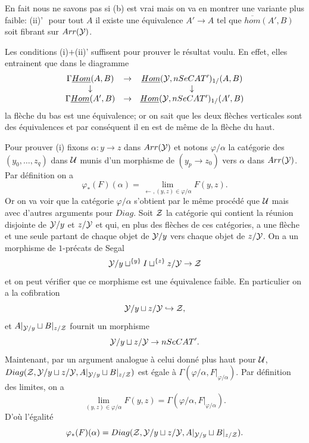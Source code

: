 \documentclass[12pt]{article}
\newcommand{\Uu}{{\cal U}}
\newcommand{\Yy}{{\cal Y}}
\newcommand{\Zz}{{\cal Z}}
\begin{document}
En fait nous ne savons pas si (b) est vrai mais on va en montrer une
variante plus
faible:
\newline
(ii)'\,\, pour tout $A$ il existe une \'equivalence $A'\rightarrow A$ tel que
$\overline{hom}(A',B)$ soit fibrant sur $Arr(\Yy )$.

Les conditions (i)$+$(ii)' suffisent pour prouver le r\'esultat
voulu. En effet, elles entrainent
que dans
le diagramme $$
\begin{array}{ccc}
\Gamma \underline{Hom}(A,B)&\rightarrow &\underline{Hom}(\Yy ,
nSeCAT')_{1/}(A,B)\\
\downarrow & & \downarrow \\
\Gamma \underline{Hom}(A',B)&\rightarrow &\underline{Hom}(\Yy ,
nSeCAT')_{1/}(A',B)
\end{array}
$$
la fl\`eche du bas est une \'equivalence; or on sait que les deux fl\`eches
verticales sont des \'equivalences et par cons\'equent
il en est de m\^eme de la fl\`eche du
haut.


Pour prouver (i) fixons $\alpha : y\rightarrow z$ dans $Arr(\Yy )$
et notons
$\varphi /\alpha $ la cat\'egorie des $(y_0,\ldots , z_q)$ dans $\Uu $
munis d'un
morphisme
de $(y_p\rightarrow z_0)$ vers $\alpha$ dans $Arr(\Yy )$.
Par d\'efinition on a
$$
\varphi _{\ast}(F)(\alpha ) = \lim _{\leftarrow , (y,z)\in \varphi /\alpha }
F(y,z).
$$
Or on va voir que la cat\'egorie $\varphi /\alpha $ s'obtient par le m\^eme
proc\'ed\'e que
$\Uu $ mais avec d'autres arguments pour $Diag$. Soit $\Zz$ la cat\'egorie qui
contient la r\'eunion disjointe de $\Yy /y$ et $z/\Yy$ et qui, en plus des
fl\`eches de ces
cat\'egories, a une fl\`eche et une seule partant de chaque objet de $\Yy
/y$ vers
chaque objet de $z/\Yy$. On a  un morphisme de $1$-pr\'ecats de Segal
$$
\Yy /y \sqcup ^{\{ y\} } I \sqcup ^{\{ z \} } z/\Yy \rightarrow \Zz
$$
et on peut v\'erifier que ce morphisme est une \'equivalence faible.
En particulier on a la cofibration
$$
\Yy /y \sqcup z/\Yy \hookrightarrow \Zz ,
$$
et $A|_{\Yy /y}\sqcup B|_{z/\Zz}$ fournit un morphisme
$$
\Yy /y \sqcup z/\Yy\rightarrow nSeCAT'.
$$
Maintenant, par un argument
analogue \`a celui donn\'e plus haut pour $\Uu$,
$Diag (\Zz ,\Yy /y \sqcup z/\Yy, A|_{\Yy /y}\sqcup B|_{z/\Zz})$
est \'egale \`a
$\Gamma (\varphi /\alpha , F|_{\varphi /\alpha }).$
Par d\'efinition des limites, on a
$$
\lim _{(y,z)\in \varphi /\alpha }
F(y,z) = \Gamma (\varphi /\alpha , F|_{\varphi /\alpha }).
$$
D'o\`u l'\'egalit\'e
$$
\varphi _{\ast}(F)(\alpha )=
Diag (\Zz ,\Yy /y \sqcup z/\Yy, A|_{\Yy /y}\sqcup B|_{z/\Zz}).
$$
\end{document}
